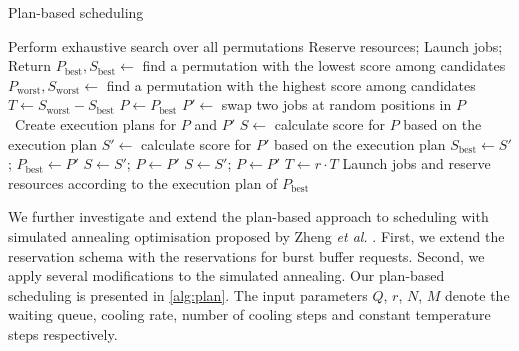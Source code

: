 \documentclass[runningheads]{llncs}
\begin{document}
\begin{algorithm}[tb]
\caption{Plan-based scheduling}
\label{alg:plan}
\begin{algorithmic}[1]
    \State Perform exhaustive search over all permutations
    \State Reserve resources; Launch jobs; Return
  \EndIf
  \State $P_{\text{best}}, S_{\text{best}} \gets$ find a permutation with the lowest score among  candidates
  \State $P_{\text{worst}}, S_{\text{worst}} \gets$ find a permutation with the highest score among  candidates
    \State $T \gets S_{\text{worst}} - S_{\text{best}}$ \label{alg:plan:temp}
    \State $P \gets P_{\text{best}}$
        \State $P' \gets$ swap two jobs at random positions in $P$\
        \State Create execution plans for $P$ and $P'$
        \State $S \gets$ calculate score for $P$ based on the execution plan
        \State $S' \gets$ calculate score for $P'$ based on the execution plan
        \If{$S' < S_{\text{best}}$}
          \State $S_{\text{best}} \gets S'$; $P_{\text{best}} \gets P'$
          \State $S \gets S'$; $P \gets P'$
          \State $S \gets S'$; $P \gets P'$
        \EndIf
      \EndFor
      \State $T \gets r \cdot T$
    \EndFor
  \EndIf
  \State Launch jobs and reserve resources according to the execution plan of $P_{\text{best}}$
\EndProcedure
\end{algorithmic}
\end{algorithm}

We further investigate and extend the plan-based approach to scheduling with simulated annealing optimisation proposed by Zheng \textit{et al.} \cite{7776518}. First, we extend the reservation schema with the reservations for burst buffer requests. Second, we apply several modifications to the simulated annealing. Our plan-based scheduling is presented in \cref{alg:plan}. The input parameters $Q$, $r$, $N$, $M$ denote the waiting queue, cooling rate, number of cooling steps and constant temperature steps respectively.
\end{document}
